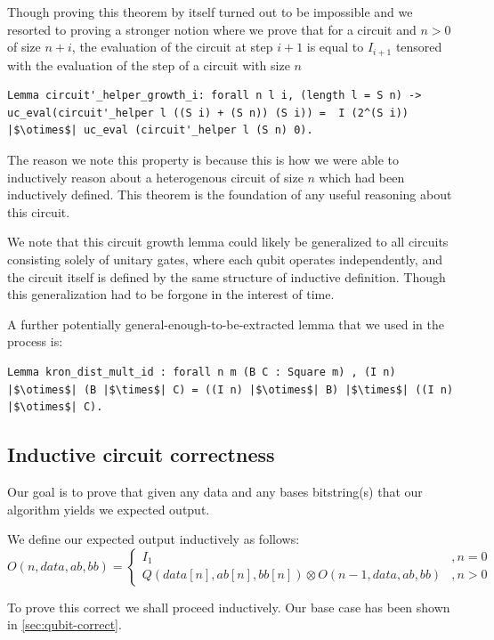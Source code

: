 \documentclass{article}
\begin{document}
Though proving this theorem by itself turned out to be impossible and we resorted to proving a stronger notion where we prove that for a circuit and $n>0$ of size $n+i$, the evaluation of the circuit at step $i+1$ is equal to $I_{i+1}$ tensored with the evaluation of the  step of a circuit with size $n$
\begin{verbatim}
Lemma circuit'_helper_growth_i: forall n l i, (length l = S n) -> uc_eval(circuit'_helper l ((S i) + (S n)) (S i)) =  I (2^(S i)) |$\otimes$| uc_eval (circuit'_helper l (S n) 0).
\end{verbatim}

The reason we note this property is because this is how we were able to inductively reason about a heterogenous circuit of size $n$ which had been inductively defined.
This theorem is the foundation of any useful reasoning about this circuit.

We note that this circuit growth lemma could likely be generalized to all circuits consisting solely of unitary gates, where each qubit operates independently, and the circuit itself is defined by the same structure of inductive definition. Though this generalization had to be forgone in the interest of time.

A further potentially general-enough-to-be-extracted lemma that we used in the process is:
\begin{verbatim}
Lemma kron_dist_mult_id : forall n m (B C : Square m) , (I n) |$\otimes$| (B |$\times$| C) = ((I n) |$\otimes$| B) |$\times$| ((I n) |$\otimes$| C).
\end{verbatim}
\subsection{Inductive circuit correctness}\label{sec:circuit-correct}
Our goal is to prove that given any data and any bases bitstring(s) that our algorithm yields we expected output.

We define our expected output inductively as follows:
$$O(n,data,ab,bb) = \begin{cases}I_1&,n=0\\ Q(data[n],ab[n],bb[n]) \otimes O(n-1, data, ab,bb)&, n>0\end{cases}$$

To prove this correct we shall proceed inductively. Our base case has been shown in \cref{sec:qubit-correct}.
\end{document}
